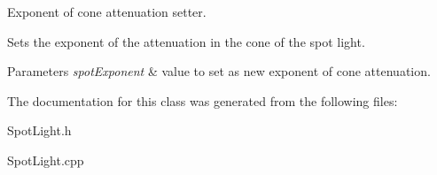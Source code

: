 Exponent of cone attenuation setter. 

Sets the exponent of the attenuation in the cone of the spot light.


\begin{DoxyParams}{Parameters}
{\em spot\+Exponent} & value to set as new exponent of cone attenuation. \\
\hline
\end{DoxyParams}


The documentation for this class was generated from the following files\+:\begin{DoxyCompactItemize}
\item 
Spot\+Light.\+h\item 
Spot\+Light.\+cpp\end{DoxyCompactItemize}
